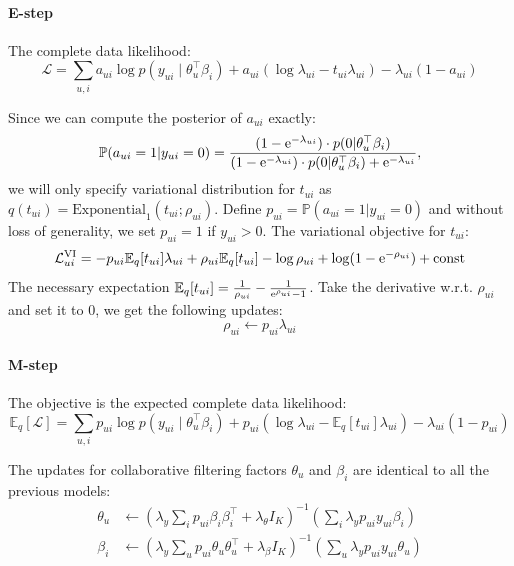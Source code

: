 \paragraph{E-step} The complete data likelihood:
\begin{equation}
\mathcal{L} = \sum_{u, i} a_{ui}\log p(y_{ui} \mid \theta_u^\top\beta_i) + a_{ui} (\log \lambda_{ui} - t_{ui} \lambda_{ui}) - \lambda_{ui}(1 - a_{ui})
\end{equation}

Since we can compute the posterior of $a_{ui}$ exactly:
\begin{equation}
\mathbb{P}(a_{ui} = 1 | y_{ui} = 0) = \frac{(1 - \mathrm{e}^{-\lambda_{ui}}) \cdot p(0 | \theta_u^\top\beta_i)}{(1 - \mathrm{e}^{-\lambda_{ui}})\cdot p(0 |  \theta_u^\top\beta_i) + \mathrm{e}^{-\lambda_{ui}}},
\end{equation}
we will only specify variational distribution for $t_{ui}$ as $q(t_{ui}) = \text{Exponential}_1(t_{ui}; \rho_{ui})$. Define $p_{ui} = \mathbb{P}(a_{ui} = 1 | y_{ui} = 0)$ and without loss of generality, we set $p_{ui} = 1$ if $y_{ui} > 0$. The variational objective for $t_{ui}$:
\[
\mathcal{L}^\text{VI}_{ui} = -p_{ui}\mathbb{E}_q[t_{ui}] \lambda_{ui} + \rho_{ui} \mathbb{E}_q[t_{ui}] - \log\rho_{ui} + \log(1 - \mathrm{e}^{-\rho_{ui}}) + \text{const}
\]
The necessary expectation $\mathbb{E}_q[t_{ui}] = \frac{1}{\rho_{ui}} - \frac{1}{\mathrm{e}^{\rho_{ui}} - 1}$. Take the derivative w.r.t. $\rho_{ui}$ and set it to $0$, we get the following updates:
\[
\rho_{ui} \leftarrow p_{ui}\lambda_{ui}
\]
\paragraph{M-step}  The objective is the expected complete data likelihood:
\begin{equation}
\mathbb{E}_q[\mathcal{L}] = \sum_{u, i} p_{ui} \log p(y_{ui} \mid \theta_u^\top\beta_i) + p_{ui} (\log\lambda_{ui}- \mathbb{E}_q[t_{ui}] \lambda_{ui}) - \lambda_{ui}(1 - p_{ui})
\end{equation}

The updates for collaborative filtering factors $\theta_u$ and $\beta_i$ are identical to all the previous models:
\begin{align}
\theta_u &\leftarrow \textstyle(\lambda_y \sum_i p_{ui} \beta_i \beta_i^\top +  \lambda_\theta I_K)^{-1} (\sum_i \lambda_y p_{ui} y_{ui} \beta_i ) \\
\beta_i &\leftarrow \textstyle(\lambda_y \sum_u p_{ui} \theta_u \theta_u^\top + \lambda_\beta I_K)^{-1} (\sum_u \lambda_y p_{ui} {y}_{ui} \theta_u)
\end{align}

